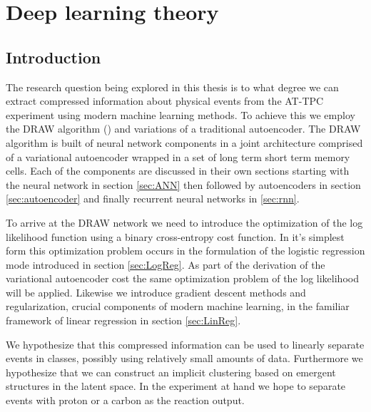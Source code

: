 \chapter{Deep learning theory}\label{ch:ml}
\section{Introduction}

The research question being explored in this thesis is to what degree we can extract compressed information about physical events from the AT-TPC experiment using modern machine learning methods. To achieve this we employ the DRAW algorithm (\cite{Gregor2015}) and variations of a traditional autoencoder. The DRAW algorithm is built of neural network components in a joint architecture comprised of a variational autoencoder wrapped in a set of long term short term memory cells. Each  of the components are discussed in their own sections starting with the neural network in  section \ref{sec:ANN} then followed by autoencoders in section \ref{sec:autoencoder} and finally recurrent neural networks in \ref{sec:rnn}. 

To arrive at the DRAW network we need to introduce the optimization of the log likelihood function using a binary cross-entropy cost function. In it's simplest form this optimization problem occurs in the formulation of the logistic regression mode introduced in section \ref{sec:LogReg}. As part of the derivation of the variational autoencoder cost the same optimization problem of the log likelihood will be applied. Likewise we introduce gradient descent methods and regularization, crucial components of modern machine learning, in the familiar framework of linear regression in section \ref{sec:LinReg}. 

We hypothesize that this compressed information can be used to linearly separate events in classes, possibly using relatively small amounts of data. Furthermore we hypothesize that we can construct an implicit clustering based on emergent structures in the latent space. In the experiment at hand we hope to separate events with proton or a carbon as the reaction output. 